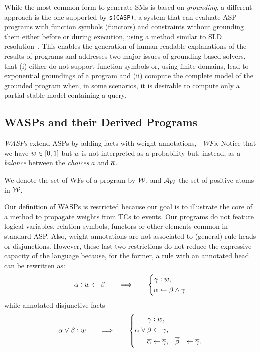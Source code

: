 \documentclass[x11names]{tlp}
\renewcommand{\cite}{\citep}
\begin{document}
While the most common form to generate \aclp{SM} is based on \emph{grounding}, a different approach is the one supported by \texttt{s(CASP)}, a system that can evaluate \ac{ASP} programs with function symbols (functors) and constraints without grounding them either before or during execution, using a method similar to SLD resolution~\cite{marple2017computing,arias2020justifications}.
%
%
This enables the generation of human readable explanations of the results of programs and addresses two major issues of grounding-based solvers, that 
(i) either do not support function symbols or, using finite domains, lead to exponential groundings of a program and 
(ii) compute the complete model of the grounded program when, in some scenarios, it is desirable to compute only a partial stable model containing a query.%

\subsection*{\acsp{WASP} and their Derived Programs}

\emph{\Acfp{WASP}} extend \acp{ASP} by adding facts with weight annotations, \ie\ \emph{\acfp{WF}}.
%
Notice that we have $w\in \intcc{0,1}$ but $w$ is not interpreted as a probability but, instead, as a \emph{balance} between the \emph{choices} $a$ and $\overline{a}$.

We denote the set of \aclp{WF} of a program by ${\mathcal{W}}$, and ${\mathcal{A}}_{{\mathcal{W}}}$ the set of positive atoms in ${\mathcal{W}}$.

Our definition of \acp{WASP} is restricted because our goal is to illustrate the core of a method to propagate weights from \aclp{TC} to events.
Our programs do not feature logical variables, relation symbols, functors or other elements common in standard \ac{ASP}.
Also, weight annotations are not associated to (general) rule heads or disjunctions.
However, these last two restrictions do not reduce the expressive capacity of the language because, for the former, a rule with an annotated head can be rewritten as:
\begin{equation*}
	\weightrule{\alpha}{w}{\beta} \qquad \Longrightarrow \qquad
	\left\{
		\begin{aligned}
		\weightfact{\gamma & }{w},                       %
		\\
		\alpha           & \clause \beta \wedge \gamma
	\end{aligned}
	\right.
\end{equation*}
while annotated disjunctive facts
\begin{equation*}
	\weightfact{\alpha \vee \beta}{w} \qquad \Longrightarrow \qquad
	\left\{
	\begin{aligned}
		\weightfact{\gamma  & }{w},           %
		\\
		\alpha \vee \beta & \clause \gamma,           %
		\\
		\co{\alpha}& \clause \co{\gamma},  &&
		\co{\beta}& \clause \co{\gamma}.
	\end{aligned}
	\right.
\end{equation*}
\end{document}
